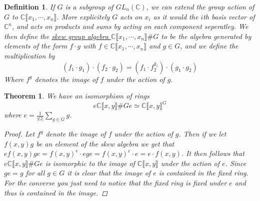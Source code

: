 \documentclass[11pt, a4paper, english]{article}
\numberwithin{prop}{section}
\numberwithin{lemma}{section}
\newtheorem{theorem}{Theorem}
\numberwithin{theorem}{section}
\newtheorem{defin}{Definition}
\numberwithin{defin}{section}
\numberwithin{example}{section}
\newcommand{\C}{\mathbb{C}}
\begin{document}
\begin{defin}
If $G$ is a subgroup of $GL_n(\C)$, we can extend the group action of $G$ to $\C\llbracket x_1, \cdots, x_n\rrbracket$. More explicitely $G$ acts on $x_i$ as it would the $i$th basis vector of $\C^n$, and acts on products and sums by acting on each component seperatley. We then define the \underline{skew group algebra $\C \llbracket x_1, \cdots, x_n \rrbracket \# G$} to be the algebra generated by elements of the form $f \cdot g$ with $f \in \C\llbracket x_1, \cdots, x_n\rrbracket$ and $g \in G$, and we define the multiplication by
$$ (f_1 \cdot g_1) \cdot (f_2 \cdot g_2) = (f_1 \cdot f_2^{g_1}) \cdot (g_1 \cdot g_2) $$
Where $f^g$ denotes the image of $f$ under the action of $g$.
\end{defin}

\begin{theorem}
We have an isomorphism of rings
$$ e \C\llbracket x, y \rrbracket \# G e \simeq \C\llbracket x, y \rrbracket^G $$
where $e = \frac{1}{|G|} \sum_{g \in G} g$.

\begin{proof}
Let $f^g$ denote the image of $f$ under the action of $g$. Then if we let $f(x,y)g$ be an element of the skew algebra we get that $e f(x,y)g e = f(x, y)^e \cdot ege = f(x, y)^e \cdot e = e \cdot f(x, y)$. It then follows that $  e \C\llbracket x, y\rrbracket \# G e$ is isomorphic to the image of $\C\llbracket x, y \rrbracket$ under the action of $e$. Since $ge=g$ for all $g\in G$ it is clear that the image of $e$ is contained in the fixed ring. For the converse you just need to notice that the fixed ring is fixed under $e$ and thus is contained in the image.
\end{proof}
\end{theorem}
\end{document}
